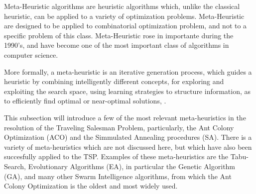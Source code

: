 Meta-Heuristic algorithms are heuristic algorithms which, unlike the classical heuristic,
can be applied to a variety of optimization problems. Meta-Heuristic are designed to be applied 
to combinatorial optimization problem, and not to a specific problem of this class. 
Meta-Heuristic rose in importante during the 1990's, and have become one of the most important class 
of algorithms in computer science.

More formally, a meta-heuristic is an iterative generation process, which guides a heuristic 
by combining intelligently different concepts, for exploring and exploiting the search space,
using learning strategies to structure information, as to efficiently find optimal or near-optimal solutions, \cite{metaheuristics_overview}.

This subsection will introduce a few of the most relevant meta-heuristics in the resolution of the 
Traveling Salesman Problem, particularly, the Ant Colony Optimization (ACO) and the Simmulated Annealing procedures (SA).
There is a variety of meta-heuristics which are not discussed here, but which have also been succesfully applied 
to the TSP. Examples of these meta-heuristics are the Tabu-Search, Evolutionary Algorithms (EA), in particular the Genetic Algorithm (GA),
and many other Swarm Intelligence algorithms, from which the Ant Colony Optimization is the oldest and most widely used.
